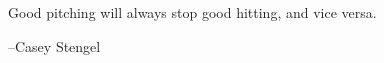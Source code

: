 \documentclass[fleqn,addpoints]{exam}
\begin{document}
\else

\vspace{4 in}



\begin{em}
  Good pitching will always stop good hitting, and vice versa.
\end{em}

\vspace{.2 cm}
\hspace{1.5 cm} --Casey Stengel

\fi
\end{document}
